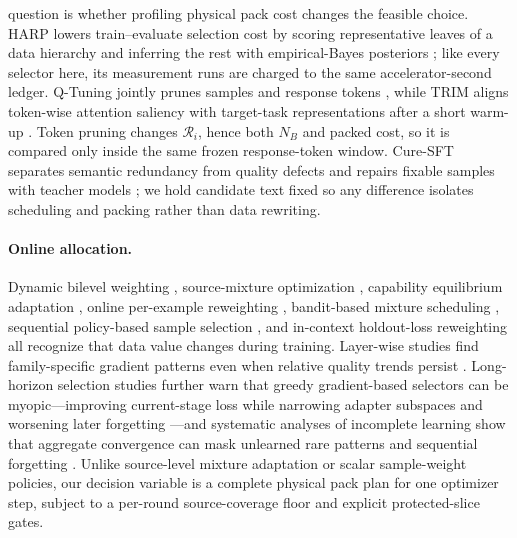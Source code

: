 \documentclass{article}
\begin{document}
question is whether profiling physical pack cost changes the feasible choice.
HARP lowers train--evaluate selection cost by scoring representative leaves of
a data hierarchy and inferring the rest with empirical-Bayes posteriors
\cite{wang2026harp}; like every selector here, its measurement runs are charged
to the same accelerator-second ledger. Q-Tuning jointly prunes samples and
response tokens \cite{wang2025qtuning}, while TRIM aligns token-wise attention
saliency with target-task representations after a short warm-up
\cite{nagaraj2026trim}. Token pruning changes $\mathcal R_i$,
hence both $N_B$ and packed cost, so it is compared only inside the same
frozen response-token window. Cure-SFT separates semantic redundancy from
quality defects and repairs fixable samples with teacher models
\cite{fu2026curesft}; we hold candidate text fixed so any difference isolates
scheduling and packing rather than data rewriting.

\paragraph{Online allocation.}
Dynamic bilevel weighting \cite{yu2025dynamicbilevel}, source-mixture
optimization \cite{tan2026fastmix}, capability equilibrium adaptation
\cite{ming2026ideal}, online per-example reweighting \cite{zhao2026adapt},
bandit-based mixture scheduling \cite{shin2026dynamixsft}, sequential
policy-based sample selection \cite{yang2026dataagent}, and in-context
holdout-loss reweighting \cite{zhang2026ica} all recognize that
data value changes during training. Layer-wise studies find family-specific
gradient patterns even when relative quality trends persist
\cite{li2026gradients}. Long-horizon selection studies further warn that greedy
gradient-based selectors can be myopic---improving current-stage loss while
narrowing adapter subspaces and worsening later forgetting
\cite{yang2026lhas}---and systematic analyses of incomplete learning show that
aggregate convergence can mask unlearned rare patterns and sequential
forgetting \cite{xue2026ilp}. Unlike source-level mixture adaptation or scalar
sample-weight policies, our decision
variable is a complete physical pack plan for one optimizer step, subject to a
per-round source-coverage floor and explicit protected-slice gates.
\end{document}
